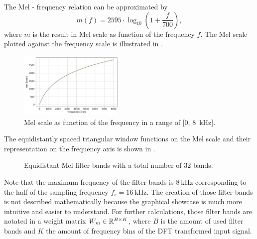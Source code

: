 The Mel - frequency relation can be approximated by
\begin{equation}\label{eq:signal_mfcc_mel}
  m(f) = 2595 \cdot \log_{10} \left(1 + \frac{f}{700} \right),
\end{equation}
where $m$ is the result in Mel scale as function of the frequency $f$.
The Mel scale plotted against the frequency scale is illustrated in .
\begin{figure}[!ht]
  \centering
  \includegraphics[width=0.45\textwidth]{./3_signal/figs/signal_mfcc_mel_scale.png}
  \caption{Mel scale as function of the frequency in a range of [0, \SI{8}{\kilo\hertz}].}
  \label{fig:signal_mfcc_mel_scale}
\end{figure}
\FloatBarrier
\noindent
The equidistantly spaced triangular window functions on the Mel scale and their representation on the frequency axis is shown in .
\begin{figure}[!ht]
  \centering
  \quad
  \caption{Equidistant Mel filter bands with a total number of 32 bands.}
  \label{fig:filter_bands}
\end{figure}
\FloatBarrier
\noindent
Note that the maximum frequency of the filter bands is $\SI{8}{\kilo\hertz}$ corresponding to the half of the sampling frequency $f_s = \SI{16}{\kilo\hertz}$.
The creation of those filter bands is not described mathematically because the graphical showcase is much more intuitive and easier to understand.
For further calculations, those filter bands are notated in a weight matrix $W_m \in \mathbb{R}^{B \times K}$, where $B$ is the amount of used filter bands and $K$ the amount of frequency bins of the DFT transformed input signal.

